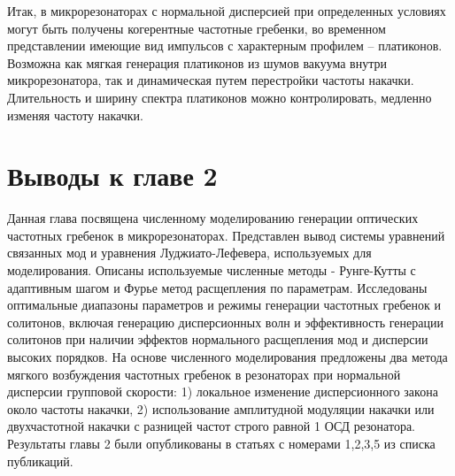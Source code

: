 Итак, в микрорезонаторах с нормальной дисперсией при определенных условиях могут быть получены когерентные частотные гребенки, во временном представлении имеющие вид импульсов с характерным профилем – платиконов. Возможна как мягкая генерация платиконов из шумов вакуума внутри микрорезонатора, так и динамическая путем перестройки частоты накачки. Длительность и ширину спектра платиконов можно контролировать, медленно изменяя частоту накачки.

\section{Выводы к главе 2}
Данная глава посвящена численному моделированию генерации оптических частотных гребенок в микрорезонаторах. Представлен вывод системы уравнений связанных мод и уравнения Луджиато-Лефевера, используемых для моделирования. Описаны используемые численные методы - Рунге-Кутты с адаптивным шагом и Фурье метод расщепления по параметрам. Исследованы оптимальные диапазоны параметров и режимы генерации частотных гребенок и солитонов, включая генерацию дисперсионных волн и эффективность генерации солитонов при наличии эффектов нормального расщепления мод и дисперсии высоких порядков. На основе численного моделирования предложены два метода мягкого возбуждения частотных гребенок в резонаторах при нормальной дисперсии групповой скорости: 1) локальное изменение дисперсионного закона около частоты накачки, 2) использование амплитудной модуляции накачки или двухчастотной накачки с разницей частот строго равной 1 ОСД резонатора. Результаты главы 2 были опубликованы в статьях с номерами 1,2,3,5 из списка публикаций.
